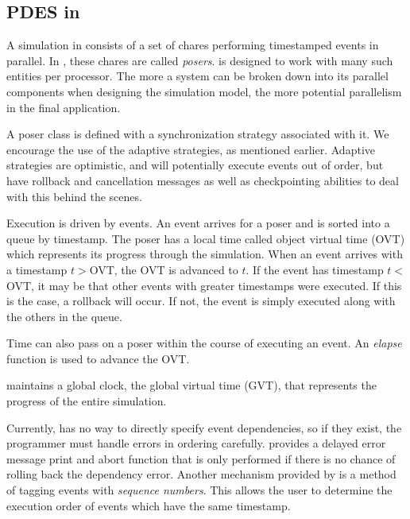 \subsection{PDES in \pose{}}

A simulation in \pose{} consists of a set of \charmpp{} chares performing
timestamped events in parallel.  In \pose{}, these chares are called {\sl
posers}.  \pose{} is designed to work with many such entities per
processor. The more a system can be broken down into its parallel
components when designing the simulation model, the more potential
parallelism in the final application.

A poser class is defined with a synchronization strategy associated
with it.  We encourage the use of the adaptive strategies, as
mentioned earlier.  Adaptive strategies are optimistic, and will
potentially execute events out of order, but have rollback and
cancellation messages as well as checkpointing abilities to deal with
this behind the scenes.

Execution is driven by events.  An event arrives for a poser and is
sorted into a queue by timestamp.  The poser has a local time called
object virtual time (OVT) which represents its progress through the
simulation.  When an event arrives with a timestamp $t>$OVT, the OVT is
advanced to $t$.  If the event has timestamp $t<$OVT, it may be that
other events with greater timestamps were executed.  If this is the
case, a rollback will occur.  If not, the event is simply executed
along with the others in the queue.

Time can also pass on a poser within the course of executing an
event.  An {\sl elapse} function is used to advance the OVT.  

\pose{} maintains a global clock, the global virtual time (GVT), that
represents the progress of the entire simulation.  

Currently, \pose{} has no way to directly specify event dependencies, so if
they exist, the programmer must handle errors in ordering carefully.
\pose{} provides a delayed error message print and abort function that
is only performed if there is no chance of rolling back the dependency
error.  Another mechanism provided by \pose{} is a method of tagging
events with {\it sequence numbers}.  This allows the user to determine the
execution order of events which have the same timestamp.
